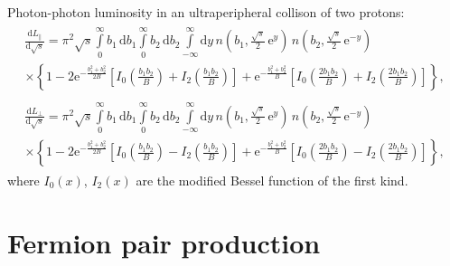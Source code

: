 \documentclass[a4paper,12pt]{article}
\begin{document}
Photon-photon luminosity in an ultraperipheral collison of two protons:
\begin{equation}
  \begin{gathered}
    \begin{multlined}
      \frac{\mathrm{d} L_\parallel}{\mathrm{d} \sqrt{s}}
      = \pi^2 \sqrt{s}
        \int\limits_0^\infty b_1 \, \mathrm{d} b_1
        \int\limits_0^\infty b_2 \, \mathrm{d} b_2
        \int\limits_{-\infty}^\infty \mathrm{d} y
        \, n \left( b_1, \tfrac{\sqrt{s}}{2} \, \mathrm{e}^y \right)
        \, n \left( b_2, \tfrac{\sqrt{s}}{2} \, \mathrm{e}^{-y} \right)
        \\  \times
        \left\{
            1
          - 2 \mathrm{e}^{-\frac{b_1^2 + b_2^2}{2 B}}
            \left[
                I_0 \left( \frac{b_1 b_2}{B} \right)
              + I_2 \left( \frac{b_1 b_2}{B} \right)
            \right]
          + \mathrm{e}^{-\frac{b_1^2 + b_2^2}{B}}
            \left[
                I_0 \left( \frac{2 b_1 b_2}{B} \right)
              + I_2 \left( \frac{2 b_1 b_2}{B} \right)
            \right]
        \right\},
    \end{multlined}
    \\
    \begin{multlined}
      \frac{\mathrm{d} L_\perp}{\mathrm{d} \sqrt{s}}
      = \pi^2 \sqrt{s}
        \int\limits_0^\infty b_1 \, \mathrm{d} b_1
        \int\limits_0^\infty b_2 \, \mathrm{d} b_2
        \int\limits_{-\infty}^\infty \mathrm{d} y
        \, n \left( b_1, \tfrac{\sqrt{s}}{2} \, \mathrm{e}^y \right)
        \, n \left( b_2, \tfrac{\sqrt{s}}{2} \, \mathrm{e}^{-y} \right)
        \\  \times
        \left\{
            1
          - 2 \mathrm{e}^{-\frac{b_1^2 + b_2^2}{2 B}}
            \left[
                I_0 \left( \frac{b_1 b_2}{B} \right)
              - I_2 \left( \frac{b_1 b_2}{B} \right)
            \right]
          + \mathrm{e}^{-\frac{b_1^2 + b_2^2}{B}}
            \left[
                I_0 \left( \frac{2 b_1 b_2}{B} \right)
              - I_2 \left( \frac{2 b_1 b_2}{B} \right)
            \right]
        \right\},
    \end{multlined}
  \end{gathered}
\end{equation}
where $I_0(x)$, $I_2(x)$ are the modified Bessel function of the first kind.

\section{Fermion pair production}
\end{document}

